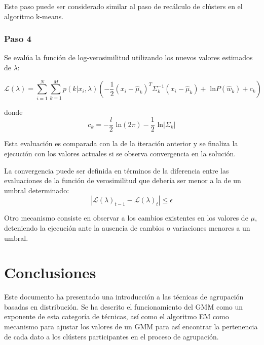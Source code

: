 \documentclass[a4paper]{article}
\begin{document}
Este paso puede ser considerado similar al paso de recálculo de clústers en el algoritmo k-means.

\subsubsection{Paso 4} %
Se evalúa la función de log-verosimilitud utilizando los nuevos valores estimados de $\lambda$:

\begin{equation}
	\mathcal{L}(\lambda) = \sum_{i=1}^N \sum_{k=1}^{M} p \left ( k|x_i,\lambda \right ) \left( -\frac{1}{2}(x_i - \hat{\mu}_k)^T \Sigma_k^{-1} (x_i - \hat{\mu}_k) + \text{ ln} P(\hat{w}_k) + c_k \right )
\end{equation}

donde
\begin{equation}
	c_k = - \frac{l}{2}\text{ ln} (2\pi) - \frac{1}{2} \text{ ln}|\Sigma_k|
\end{equation}


Esta evaluación es comparada con la de la iteración anterior y se finaliza la ejecución con los valores actuales si se observa convergencia en la solución.

La convergencia puede ser definida en términos de la diferencia entre las evaluaciones de la función de verosimilitud que debería ser menor a la de un umbral determinado:
\begin{equation}
	|\mathcal{L}(\lambda)_{t-1} - \mathcal{L}(\lambda)_{t}|\leq \epsilon
\end{equation}

Otro mecanismo consiste en observar a los cambios existentes en los valores de $\mu$, deteniendo la ejecución ante la ausencia de cambios o variaciones menores a un umbral.
\label{ssub:paso_4}


\section{Conclusiones} %
\label{sec:conclusiones}
Este documento ha presentado una introducción a las técnicas de agrupación basadas en distribución.
Se ha descrito el funcionamiento del GMM como un exponente de esta categoría de técnicas, así como el algoritmo EM como mecanismo para ajustar los valores de un GMM para así encontrar la pertenencia de cada dato a los clústers participantes en el proceso de agrupación.
\newpage 
\nocite{*}

\end{document}
